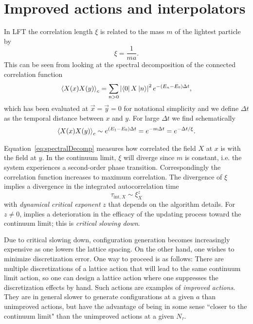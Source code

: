 \section{Improved actions and interpolators}

In LFT the correlation length $\xi$ is related to the mass $m$ of the lightest 
particle by
\begin{equation}
  \xi=\frac{1}{ma}.
\end{equation}
This can be seen from looking at the spectral decomposition of the
connected correlation function
\begin{equation}\label{eq:spectralDecomp}
  \ev{X(x)X(y)}_c=\sum_{n> 0} 
                   \left|\bra{0}X\ket{n}\right|^2
                    e^{-(E_n-E_0)\Delta t},
\end{equation}
which has been evaluated at $\vec{x}=\vec{y}=0$ for notational simplicity and
we define $\Delta t$ as the temporal distance between $x$ and $y$.
For large $\Delta t$ we find schematically
\begin{equation}
  \ev{X(x)X(y)}_c\sim e^{(E_1-E_0)\Delta t} =e^{-m\Delta t}=e^{-\Delta t/\xi}.
\end{equation}

Equation~\eqref{eq:spectralDecomp} measures how correlated the field 
$X$ at $x$ is with the field at $y$. In the continuum limit, $\xi$ will 
diverge since $m$ is constant, i.e. the system experiences a second-order 
phase transition. Correspondingly the correlation function increases to
maximum correlation. The divergence of $\xi$ implies a divergence in the
integrated autocorrelation time
\begin{equation}\label{eq:criticalSlowingDown}
  \tau_{\text{int}, X} \sim \xi_X^z
\end{equation}
with {\it dynamical critical exponent} $z$ that depends on the algorithm 
details. For $z\neq 0$,  implies a
deterioration in the efficacy of the updating process toward the
continuum limit; this is {\it critical slowing down}.

Due to critical slowing down, configuration generation becomes increasingly
expensive as one lowers the lattice spacing.
On the other hand, one wishes to minimize discretization error. One way to
proceed is as follows: There are multiple discretizations of a lattice action
that will lead to the same continuum limit action, so one can design a lattice
action where one suppresses the discretization effects by hand. Such actions
are examples of {\it improved actions}. They are in general slower to generate
configurations at a given $a$ than unimproved actions, but have the advantage
of being in some sense ``closer to the continuum limit" than the unimproved
actions at a given $N_\tau$.

